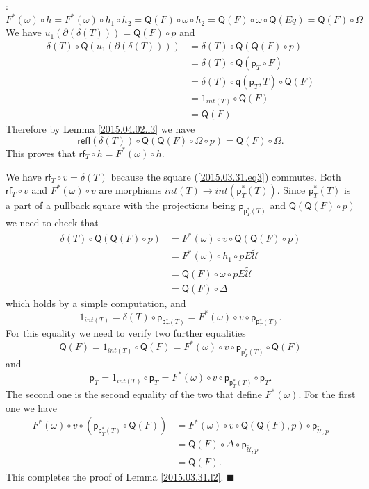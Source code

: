 \documentclass[12pt]{article}
\numberwithin{equation}{section}
\newenvironment{myproof}{{\bf Proof}:}{$\blacksquare$ \vskip 5mm }
\newcommand{\sr}{\rightarrow}
\newcommand{\wt}{\widetilde}
\newcommand{\id}{1}            %
\newcommand{\p}{\mathsf{p}}
\newcommand{\q}{\mathsf{q}}
\newcommand{\refl}{\mathsf{refl}}
\newcommand{\U}{\mathcal{U}}
\newcommand{\rf}{\mathsf{rf}}
\newcommand{\Q}{\mathsf{Q}}
\begin{document}
\begin{myproof}
%
$$F^*(\omega)\circ h=F^*(\omega)\circ h_1\circ h_2=\Q(F)\circ \omega\circ
h_2=\Q(F)\circ \omega\circ \Q(Eq)=\Q(F)\circ \Omega$$
%
We have $u_1(\partial(\delta(T)))=\Q(F)\circ p$ and
%
\begin{align*}
  \delta(T)\circ \Q(u_1(\partial(\delta(T))))
    & = \delta(T)\circ \Q(\Q(F)\circ p) \\
    & =  \delta(T)\circ \Q(\p_T\circ F) \\
    & = \delta(T)\circ \q(\p_T,T)\circ \Q(F) \\
    & = \id_{int(T)}\circ \Q(F) \\
    & = \Q(F)
\end{align*}
%
Therefore by Lemma \ref{2015.04.02.l3} we have
%
\[\refl(\delta(T))\circ \Q(\Q(F)\circ \Omega\circ p)=\Q(F)\circ \Omega.\]
%
This proves that $\rf_T\circ h=F^*(\omega)\circ h$.

We have $\rf_T\circ v=\delta(T)$ because the square (\ref{2015.03.31.eq3})
commutes.  Both $\rf_T\circ v$ and $F^*(\omega)\circ v$ are morphisms $int(T)\sr
int(\p_T^*(T))$. Since $\p_T^*(T)$ is a part of a pullback square with the
projections being $\p_{\p_T^*(T)}$ and $\Q(\Q(F)\circ p)$ we need to check that
%
\begin{align*}
  \delta(T)\circ \Q(\Q(F)\circ p)
    & = F^*(\omega)\circ v\circ \Q(\Q(F)\circ p) \\
    & = F^*(\omega)\circ h_1\circ pE\wt{\U} \\
    & = \Q(F)\circ \omega \circ pE\wt{\U} \\
    & = \Q(F)\circ \Delta
\end{align*}
%
which holds by a simple computation, and
%
\[\id_{int(T)}=\delta(T)\circ \p_{\p_T^*(T)}=F^*(\omega)\circ v\circ
\p_{\p_T^*(T)}.\]
%
For this equality we need to verify two further equalities
%
$$\Q(F)=\id_{int(T)}\circ \Q(F)=F^*(\omega)\circ v\circ \p_{\p_T^*(T)}\circ \Q(F)$$
%
and
%
\[\p_T=\id_{int(T)}\circ \p_T=F^*(\omega)\circ v\circ \p_{\p_T^*(T)}\circ \p_T.\]
%
The second one is the second equality of the two that define $F^*(\omega)$. For
the first one we have
%
\begin{align*}
  F^*(\omega)\circ v\circ (\p_{\p_T^*(T)}\circ \Q(F))
    & = F^*(\omega)\circ v\circ \Q(\Q(F),p)\circ \p_{\wt{\U},p} \\
    & = \Q(F)\circ \Delta\circ \p_{\wt{\U},p} \\
    & = \Q(F).
\end{align*}
%
This completes the proof of Lemma \ref{2015.03.31.l2}.
\end{myproof}
%
 
\end{document}
